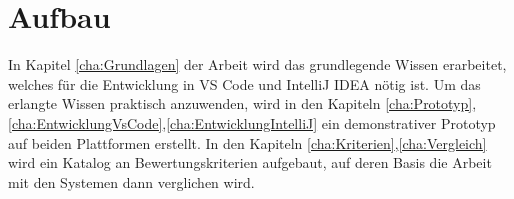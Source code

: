 \section{Aufbau}
\label{sec:Aufbau}

In Kapitel \ref{cha:Grundlagen} der Arbeit wird das grundlegende 
Wissen erarbeitet, welches für die Entwicklung in VS Code und 
IntelliJ IDEA nötig ist.
Um das erlangte Wissen praktisch anzuwenden, wird in
den Kapiteln \ref{cha:Prototyp},\ref{cha:EntwicklungVsCode},\ref{cha:EntwicklungIntelliJ}
ein demonstrativer Prototyp auf beiden Plattformen erstellt.
In den Kapiteln \ref{cha:Kriterien},\ref{cha:Vergleich} wird ein Katalog an Bewertungskriterien aufgebaut,
auf deren Basis die Arbeit mit den Systemen dann verglichen wird.